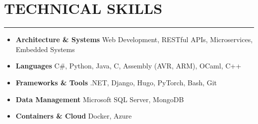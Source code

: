 \section*{TECHNICAL SKILLS}

\hrule \relax
\sectionheaderspace

\begin{itemize}[noitemsep,nolistsep, label={}]
	\item \textbf{Architecture \& Systems} \tabto*{5cm} Web Development,  RESTful APIs,  Microservices, Embedded Systems
	\item \textbf{Languages} \tabto*{5cm} C\#, Python, Java, C, Assembly (AVR, ARM), OCaml, C++
	\item \textbf{Frameworks \& Tools} \tabto*{5cm} .NET, Django, Hugo, PyTorch, Bash, Git
	\item \textbf{Data Management} \tabto*{5cm} Microsoft SQL Server, MongoDB
	\item \textbf{Containers \& Cloud} \tabto*{5cm}  Docker, Azure
\end{itemize}
\subsectionspace
